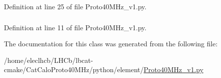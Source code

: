 Definition at line 25 of file Proto40MHz\_\-v1.py.\hypertarget{classProto40MHz__v1_1_1Proto40MHz__v1_a837aa12ca0e43af01df312a3bdffbcdc}{
\subsubsection[{softTrig}]{}}
\label{classProto40MHz__v1_1_1Proto40MHz__v1_a837aa12ca0e43af01df312a3bdffbcdc}


Definition at line 11 of file Proto40MHz\_\-v1.py.

The documentation for this class was generated from the following file:\begin{DoxyCompactItemize}
\item 
/home/eleclhcb/LHCb/lbcat-\/cmake/CatCaloProto40MHz/python/element/\hyperlink{Proto40MHz__v1_8py}{Proto40MHz\_\-v1.py}\end{DoxyCompactItemize}
